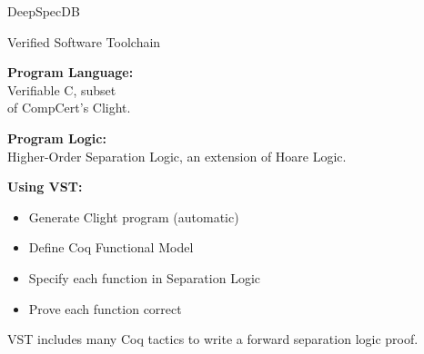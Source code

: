 \documentclass[usenames,dvipsnames]{beamer}
\def\sublock#1{\textbf{#1:}\\\vspace{0.5cm}}
\def\subsep{\vspace{1cm}}
\begin{document}
\begin{frame}[fragile]
\begin{columns}[T]
\begin{column}{.23\textwidth}
\begin{block}{DeepSpecDB}
\end{block}

\begin{block}{Verified Software Toolchain}
\sublock{Program Language}
  Verifiable C, subset\\
  of CompCert's Clight.
  \subsep
  
  \sublock{Program Logic}
  Higher-Order Separation Logic, an extension of Hoare Logic.
  \subsep
  
  \sublock{Using VST}
  \begin{itemize}
  \item Generate Clight program (automatic)
  \item Define Coq Functional Model
  \item Specify each function in Separation Logic
  \item Prove each function correct
  \end{itemize}
  \subsep
  
  VST includes many Coq tactics to write a forward separation logic proof.
\end{block}

\end{column}


\end{columns}
\end{frame}
\end{document}
